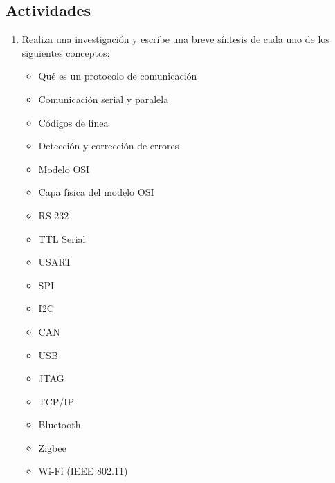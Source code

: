 \documentclass[11pt,letterpaper]{article}
\begin{document}
\subsection*{Actividades}
\begin{enumerate}[label=\arabic*)]
    \item Realiza una investigación y escribe una breve síntesis de cada uno de los siguientes conceptos:
    \begin{itemize}
        \item Qué es un protocolo de comunicación 
        \item Comunicación serial y paralela
        \item Códigos de línea 
        \item Detección y corrección de errores
        \item Modelo OSI 
        \item Capa física del modelo OSI 
        \item RS-232
        \item TTL Serial 
        \item USART
        \item SPI 
        \item I2C 
        \item CAN 
        \item USB
        \item JTAG
        \item TCP/IP 
        \item Bluetooth 
        \item Zigbee
        \item Wi-Fi (IEEE 802.11)
    \end{itemize}
\end{enumerate}
\end{document}
